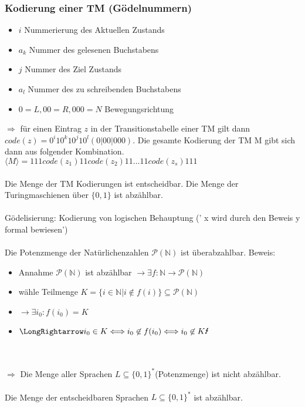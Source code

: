 \documentclass[a4paper, 10pt]{article}
\theoremstyle{definition}
\newcommand{\goedl}[1]{\langle {#1}\rangle}
\begin{document}
\subsubsection{Kodierung einer TM (Gödelnummern)}
\begin{itemize}
    \item $i$ Nummerierung des Aktuellen Zustands
    \item $a_k$ Nummer des gelesenen Buchstabens
    \item $j$ Nummer des Ziel Zustands
    \item $a_l$ Nummer des zu schreibenden Buchstabens
    \item $0=L,00=R,000=N$ Bewegungsrichtung
\end{itemize}
$\Rightarrow$ für einen Eintrag $z$ in der Transitionstabelle einer TM gilt dann 
$code(z)=0^i10^k10^j10^l(0|00|000)$. Die gesamte Kodierung der TM M gibt sich dann aus folgender Kombination.
$\goedl{M}=111code(z_1)11code(z_2)11\dots11code(z_s)111$
\\ \\
Die Menge der TM Kodierungen ist entscheidbar. Die Menge der Turingmaschienen über $\{0,1\}$ ist abzählbar.\\ \\
Gödelisierung: Kodierung von logischen Behauptung (' x wird durch den Beweis y formal bewiesen')
\\ \\ 
Die Potenzmenge der Natürlichenzahlen $\mathcal{P}(\mathbb{N})$ ist überabzahlbar. Beweis: \begin{itemize}
    \item Annahme $\mathcal{P}(\mathbb{N})$ ist abzählbar $\to \exists f:\mathbb{N}\to\mathcal{P}(\mathbb{N})$
    \item wähle Teilmenge $K=\{i\in\mathbb{N}|i\not\in f(i)\}\subseteq\mathcal{P}(\mathbb{N})$
    \item $\rightarrow \exists i_0:f(i_0)=K$
    \item $\LongRightarrow i_0\in K\Longleftrightarrow i_0\not\in f(i_0)\Longleftrightarrow i_0\not\in K \text{\Lightning}$ 
\end{itemize}\\ \\

$\Longrightarrow$ Die Menge aller Sprachen $L\subseteq\{0,1\}^*$(Potenzmenge) ist nicht abzählbar.\\ \\
Die Menge der entscheidbaren Sprachen $L\subseteq\{0,1\}^*$ ist abzählbar.
\end{document}
